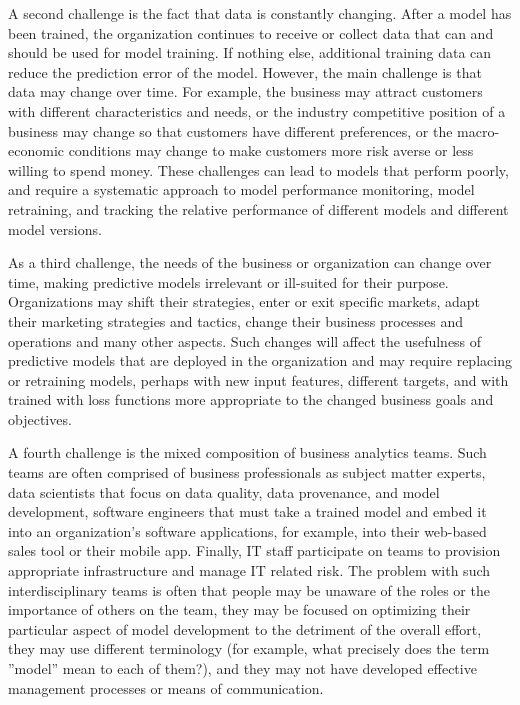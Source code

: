 A second challenge is the fact that data is constantly changing. After a model has been trained, the organization continues to receive or collect data that can and should be used for model training. If nothing else, additional training data can reduce the prediction error of the model. However, the main challenge is that data may change over time. For example, the business may attract customers with different characteristics and needs, or the industry competitive position of a business may change so that customers have different preferences, or the macro-economic conditions may change to make customers more risk averse or less willing to spend money. These challenges can lead to models that perform poorly, and require a systematic approach to model performance monitoring, model retraining, and tracking the relative performance of different models and different model versions.

As a third challenge, the needs of the business or organization can change over time, making predictive models irrelevant or ill-suited for their purpose. Organizations may shift their strategies, enter or exit specific markets, adapt their marketing strategies and tactics, change their business processes and operations and many other aspects. Such changes will affect the usefulness of predictive models that are deployed in the organization and may require replacing or retraining models, perhaps with new input features, different targets, and with trained with loss functions more appropriate to the changed business goals and objectives. 

A fourth challenge is the mixed composition of business analytics teams. Such teams are often comprised of business professionals as subject matter experts, data scientists that focus on data quality, data provenance, and model development, software engineers that must take a trained model and embed it into an organization's software applications, for example, into their web-based sales tool or their mobile app. Finally, IT staff participate on teams to provision appropriate infrastructure and manage IT related risk. The problem with such interdisciplinary teams is often that people may be unaware of the roles or the importance of others on the team, they may be focused on optimizing their particular aspect of model development to the detriment of the overall effort, they may use different terminology (for example, what precisely does the term ''model'' mean to each of them?), and they may not have developed effective management processes or means of communication. 

